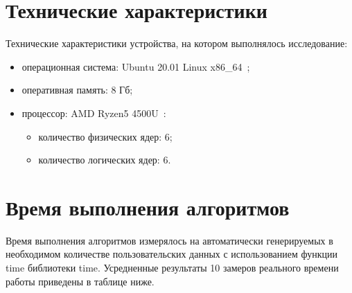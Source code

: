 \documentclass[a4paper,oneside,14pt]{extreport}
\begin{document}
\section{Технические характеристики}
Технические характеристики устройства, на котором выполнялось исследование:
\begin{itemize}
	\item операционная система: Ubuntu 20.01 Linux x86\_64~\cite{ubuntu};
	\item оперативная память: 8 Гб;
	\item процессор: AMD Ryzen5 4500U~\cite{processor}:
	\begin{itemize}
		\item количество физических ядер: 6;
		\item количество логических ядер: 6.
	\end{itemize}
\end{itemize}

\section{Время выполнения алгоритмов}
Время выполнения алгоритмов измерялось на автоматически генерируемых в необходимом количестве пользовательских данных с использованием функции time библиотеки time. Усредненные результаты 10 замеров реального времени работы приведены в таблице ниже.
\end{document}
